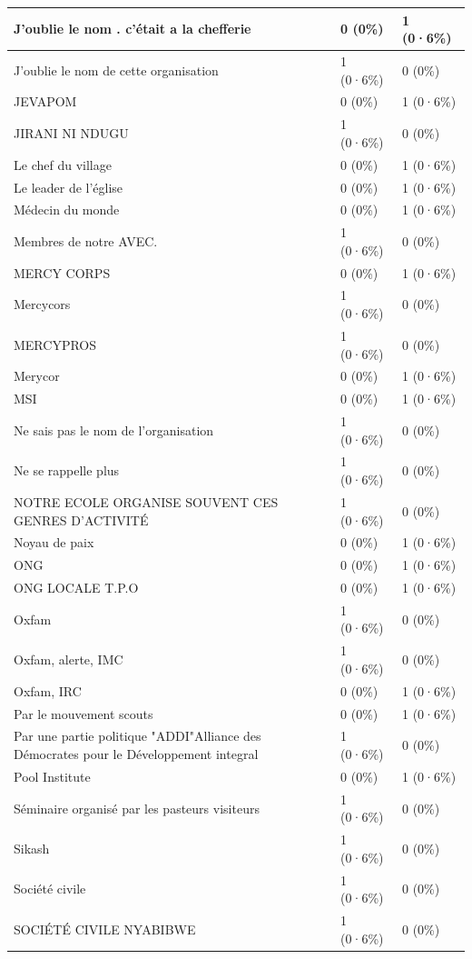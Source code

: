 \documentclass[
]{book}
\begin{document}
\begin{tabular}{l|l|l}
\hline
J'oublie le nom . c'était a la chefferie & 0 (0\%) & 1 (0·6\%)\\
\hline
J'oublie le nom de cette organisation & 1 (0·6\%) & 0 (0\%)\\
\hline
JEVAPOM & 0 (0\%) & 1 (0·6\%)\\
\hline
JIRANI NI NDUGU & 1 (0·6\%) & 0 (0\%)\\
\hline
Le chef du village & 0 (0\%) & 1 (0·6\%)\\
\hline
Le leader de l'église & 0 (0\%) & 1 (0·6\%)\\
\hline
Médecin du monde & 0 (0\%) & 1 (0·6\%)\\
\hline
Membres de notre AVEC. & 1 (0·6\%) & 0 (0\%)\\
\hline
MERCY CORPS & 0 (0\%) & 1 (0·6\%)\\
\hline
Mercycors & 1 (0·6\%) & 0 (0\%)\\
\hline
MERCYPROS & 1 (0·6\%) & 0 (0\%)\\
\hline
Merycor & 0 (0\%) & 1 (0·6\%)\\
\hline
MSI & 0 (0\%) & 1 (0·6\%)\\
\hline
Ne sais pas le nom de l'organisation & 1 (0·6\%) & 0 (0\%)\\
\hline
Ne se rappelle plus & 1 (0·6\%) & 0 (0\%)\\
\hline
NOTRE ECOLE ORGANISE SOUVENT CES GENRES D'ACTIVITÉ & 1 (0·6\%) & 0 (0\%)\\
\hline
Noyau de paix & 0 (0\%) & 1 (0·6\%)\\
\hline
ONG & 0 (0\%) & 1 (0·6\%)\\
\hline
ONG LOCALE T.P.O & 0 (0\%) & 1 (0·6\%)\\
\hline
Oxfam & 1 (0·6\%) & 0 (0\%)\\
\hline
Oxfam, alerte, IMC & 1 (0·6\%) & 0 (0\%)\\
\hline
Oxfam, IRC & 0 (0\%) & 1 (0·6\%)\\
\hline
Par le mouvement scouts & 0 (0\%) & 1 (0·6\%)\\
\hline
Par une partie politique "ADDI"Alliance des Démocrates pour le Développement integral & 1 (0·6\%) & 0 (0\%)\\
\hline
Pool Institute & 0 (0\%) & 1 (0·6\%)\\
\hline
Séminaire organisé par les pasteurs visiteurs & 1 (0·6\%) & 0 (0\%)\\
\hline
Sikash & 1 (0·6\%) & 0 (0\%)\\
\hline
Société civile & 1 (0·6\%) & 0 (0\%)\\
\hline
SOCIÉTÉ CIVILE NYABIBWE & 1 (0·6\%) & 0 (0\%)\\

\end{tabular}
\end{document}
